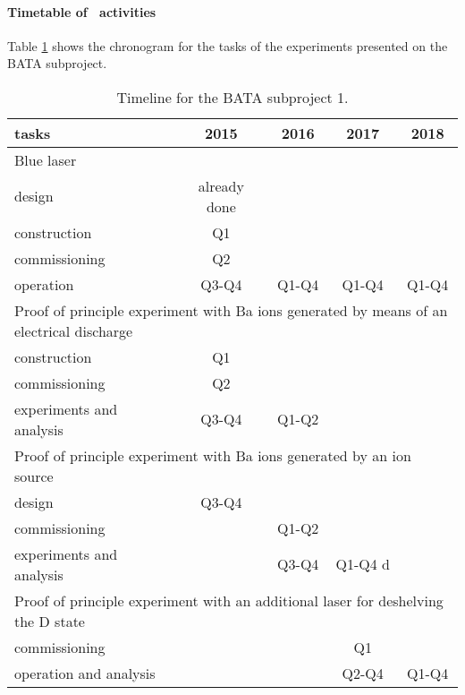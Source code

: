\paragraph{Timetable of \BATA\ activities}
Table \ref{tab:schedule_calibration} shows the chronogram for the tasks of the experiments presented on the BATA subproject. 

\begin{table}
\begin{center}
\begin{tabular}{| l | c | c | c | c |}
\hline
tasks & 2015 & 2016 & 2017 & 2018 \\
\hline
\hline
\multicolumn{5}{|l|}{Blue laser}  \\
\hline
\hline
design & already done & & &  \\
construction & Q1 & & & \\
commissioning & Q2& & & \\
operation &  Q3-Q4 & Q1-Q4 &  Q1-Q4&  Q1-Q4\\
\hline
\hline
\multicolumn{5}{|l|}{Proof of principle experiment with Ba ions generated by means of an electrical discharge}  \\
\hline
\hline
construction  &  Q1 & & & \\
commissioning &  Q2 & & & \\
experiments and analysis &  Q3-Q4 & Q1-Q2& & \\
\hline
\hline
\multicolumn{5}{|l|}{Proof of principle experiment with Ba ions generated by an ion source}  \\
\hline
\hline
design & Q3-Q4 & & &  \\
commissioning  &  & Q1-Q2& & \\
experiments and analysis &  & Q3-Q4 & Q1-Q4 d& \\
\hline
\hline
\multicolumn{5}{|l|}{Proof of principle experiment with an additional laser for deshelving the D state}  \\
\hline
\hline
commissioning  &  &  & Q1 & \\
operation and analysis &  &  & Q2-Q4 & Q1-Q4 \\
\hline
\hline
\end{tabular}
\caption{Timeline for the BATA subproject 1.}
\label{tab:schedule_calibration}
\end{center}


\end{table}
